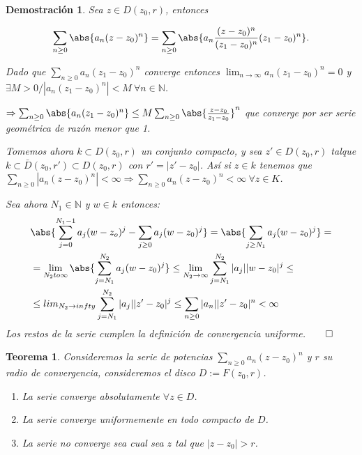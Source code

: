\documentclass[10pt]{book}
\newtheorem{theorem}{Teorema}[chapter]
\newtheorem*{dem}{Demostración}
\newcommand{\N}{\mathbb{N}}
\begin{document}
\begin{dem}
Sea $z\in D(z_0,r)$, entonces  

$$\sum_{n\geq 0} \abs{a_n(z-z_0)^n} = \sum_{n\geq 0}\abs{a_n\frac{(z-z_0)^n}{(z_1-z_0)^n}(z_1-z_0)^n}.$$

Dado que  $\sum_{n\geq 0} a_n(z_1-z_0)^n$ converge entonces $\lim_{n\to \infty} a_n(z_1-z_0)^n =0$ y $\exists M>0 / |a_n(z_1-z_0)^n|<M\ \forall n\in\N$.

$\Rightarrow \sum_{n\geq 0} \abs{a_n(z_1-z_0)^n} \leq M\sum_{n\geq 0} \abs{\frac{z-z_0}{z_1-z_0}}^n$ que converge por ser serie geométrica de razón menor que 1.

Tomemos ahora $k\subset D(z_0,r)$ un conjunto compacto, y sea $z' \in D(z_0,r)$ talque $k\subset \bar{D}(z_0,r')\subset D(z_0,r)$ con $r' = |z'-z_0|$.
Así si $z\in k$ tenemos que $\sum_{n\geq 0} |a_n(z-z_0)^n| <\infty \Rightarrow \sum_{n\geq 0} a_n(z-z_0)^n < \infty\ \forall z \in K$.

Sea ahora $N_1 \in \N$ y $w \in k$ entonces:
\begin{align*}
&\abs{ \sum_{j=0}^{N_1-1} a_j(w-z_o)^j - \sum_{j\geq 0}a_j(w-z_0)^j } = \abs{ \sum_{j\geq N_1}a_j(w-z_0)^j  } =\\
&=\lim_{N_2 to \infty} \abs{ \sum_{j = N_1}^{N_2}a_j(w-z_0)^j  } \leq \lim_{N_2\to \infty} \sum_{j=N_1}^{N_2}|a_j||w-z_0|^j \leq\\
&\leq lim_{N_2 \to infty} \sum_{j=N_1}^{N_2}|a_j||z'-z_0|^j \leq \sum_{n\geq 0}|a_n||z'-z_0|^n < \infty
\end{align*}
Los restos de la serie cumplen la definición de convergencia uniforme.$\qed$
\end{dem}

\begin{theorem}
Consideremos la serie de potencias $\sum_{n\geq 0} a_n(z-z_0)^n$ y $r$ su radio de convergencia, consideremos el disco $D := F(z_0,r)$.
\begin{enumerate}
\item La serie converge absolutamente $\forall z \in D$.
\item La serie converge uniformemente en todo compacto de $D$.
\item La serie no converge sea cual sea $z$ tal que $|z-z_0|>r$.
\end{enumerate}
\end{theorem}
\end{document}
